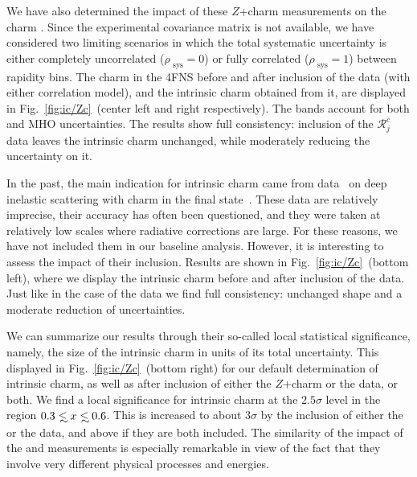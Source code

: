  We have also determined the impact of these \lhcb $Z$+charm measurements on the
charm \pdf.
%
Since the experimental covariance matrix is not available,
we have considered two limiting scenarios in which the total
systematic uncertainty is either completely uncorrelated 
($\rho_\textrm{ sys}=0$) or fully correlated  ($\rho_\textrm{ sys}=1$) between
 rapidity bins. The charm \pdf in the 4FNS before and after
inclusion of the \lhcb data (with either correlation model), and the intrinsic
charm \pdf obtained from it, are displayed in
Fig.~\ref{fig:ic/Zc}~(center left and right respectively).
%
The bands account for both \pdf and MHO uncertainties.
%
The results show full consistency: inclusion of the \lhcb  $\mathcal{R}_j^c$ data leaves
the intrinsic charm \pdf unchanged, while moderately reducing the
uncertainty on it.

In the past, the main indication for  intrinsic charm came from \emc data~\cite{Aubert:1982tt} on deep inelastic scattering with charm in the final state~\cite{Harris:1995jx}.
%
These data are relatively imprecise, their accuracy has often been questioned,
and they were taken at relatively low scales where radiative corrections are large.
%
For these reasons, we have not included them in our baseline
analysis.
%
However, it is interesting to assess the impact of
their inclusion.
%
Results are shown in 
Fig.~\ref{fig:ic/Zc}~(bottom left), where we display the
intrinsic charm \pdf before and after inclusion of the \emc data.
%
Just
like in the case of the \lhcb data we find full consistency: unchanged
shape and a moderate reduction of uncertainties.

We can summarize our results  through their so-called local statistical
significance, namely, the size of the intrinsic charm \pdf
in units of its total uncertainty.
%
This displayed  in Fig.~\ref{fig:ic/Zc}~(bottom right) for our default determination of
intrinsic charm, as well as after inclusion of either the \lhcb $Z$+charm or the
\emc data, or both.
%
We find a local significance for intrinsic charm at the $2.5\sigma$ level
in the region $0.3 \lsim x \lsim 0.6$.
%
This is increased to about
$3\sigma$ by the inclusion of either the \emc or the \lhcb
data, and above if they are both included.
%
The similarity of the impact of the \emc and \lhcb measurements is
especially remarkable in view of the fact that they involve very
different physical processes and energies.
